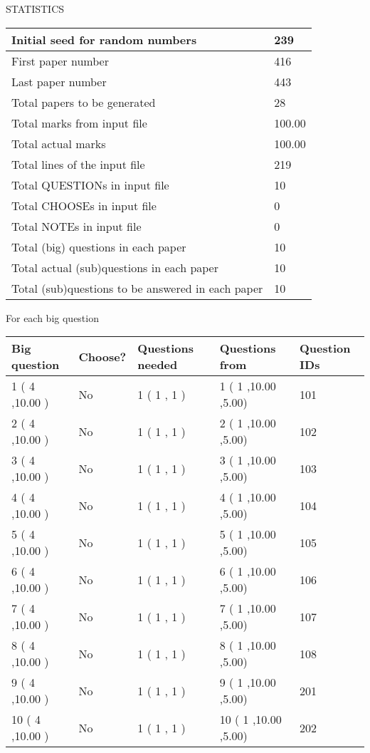 \documentclass{ctexart}
\begin{document}
   
 {\LARGE{STATISTICS}}
   
\vspace{0.2in}
   
 \begin{tabular}{|l|l|}
 \hline
 Initial seed for random numbers & 239  \\
\hline
 First paper number & 416  \\
\hline
 Last  paper number & 443  \\
\hline
 Total papers to be generated & 28  \\
\hline
Total marks from input file & 100.00 \\
\hline
Total actual marks & 100.00 \\
\hline
 Total lines of the input file & 219  \\
 \hline
 Total QUESTIONs in input file & 10  \\
\hline
 Total CHOOSEs in input file & 0  \\
\hline
 Total NOTEs in input file & 0  \\
\hline
 Total (big) questions in each paper & 10  \\
\hline
 Total actual (sub)questions in each paper & 10  \\
\hline
 Total (sub)questions to be answered in each paper & 10  \\
\hline
 \end{tabular}
   
   
 \newpage
   
{\LARGE{For each big question}}
   
   
\vspace{0.2in}
   
   
\noindent\hspace{-0.4in}\begin{tabular}{|l|l|l|l|l|}
\hline
 Big question & Choose? & Questions needed & Questions from & Question IDs \\ 
\hline
 1 ( 4 ,10.00
 ) &  No   & 
 1 ( 1 ,  1 ) &  1 ( 1
,10.00
 ,5.00) &  101  \\
 \hline
 2 ( 4 ,10.00
 ) &  No   & 
 1 ( 1 ,  1 ) &  2 ( 1
,10.00
 ,5.00) &  102  \\
 \hline
 3 ( 4 ,10.00
 ) &  No   & 
 1 ( 1 ,  1 ) &  3 ( 1
,10.00
 ,5.00) &  103  \\
 \hline
 4 ( 4 ,10.00
 ) &  No   & 
 1 ( 1 ,  1 ) &  4 ( 1
,10.00
 ,5.00) &  104  \\
 \hline
 5 ( 4 ,10.00
 ) &  No   & 
 1 ( 1 ,  1 ) &  5 ( 1
,10.00
 ,5.00) &  105  \\
 \hline
 6 ( 4 ,10.00
 ) &  No   & 
 1 ( 1 ,  1 ) &  6 ( 1
,10.00
 ,5.00) &  106  \\
 \hline
 7 ( 4 ,10.00
 ) &  No   & 
 1 ( 1 ,  1 ) &  7 ( 1
,10.00
 ,5.00) &  107  \\
 \hline
 8 ( 4 ,10.00
 ) &  No   & 
 1 ( 1 ,  1 ) &  8 ( 1
,10.00
 ,5.00) &  108  \\
 \hline
 9 ( 4 ,10.00
 ) &  No   & 
 1 ( 1 ,  1 ) &  9 ( 1
,10.00
 ,5.00) &  201  \\
 \hline
 10 ( 4 ,10.00
 ) &  No   & 
 1 ( 1 ,  1 ) &  10 ( 1
,10.00
 ,5.00) &  202  \\
 \hline
 \end{tabular}
 
 
\end{document}
